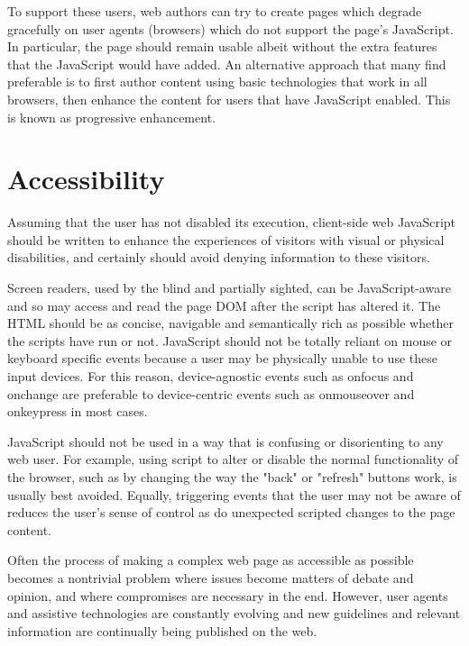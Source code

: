 To support these users, web authors can try to create pages which degrade gracefully on user agents (browsers) which do not support the page's JavaScript. In particular, the page should remain usable albeit without the extra features that the JavaScript would have added. An alternative approach that many find preferable is to first author content using basic technologies that work in all browsers, then enhance the content for users that have JavaScript enabled. This is known as progressive enhancement.

\section{Accessibility}


Assuming that the user has not disabled its execution, client-side web JavaScript should be written to enhance the experiences of visitors with visual or physical disabilities, and certainly should avoid denying information to these visitors.


Screen readers, used by the blind and partially sighted, can be JavaScript-aware and so may access and read the page DOM after the script has altered it. The HTML should be as concise, navigable and semantically rich as possible whether the scripts have run or not. JavaScript should not be totally reliant on mouse or keyboard specific events because a user may be physically unable to use these input devices. For this reason, device-agnostic events such as onfocus and onchange are preferable to device-centric events such as onmouseover and onkeypress in most cases.


JavaScript should not be used in a way that is confusing or disorienting to any web user. For example, using script to alter or disable the normal functionality of the browser, such as by changing the way the "back" or "refresh" buttons work, is usually best avoided. Equally, triggering events that the user may not be aware of reduces the user's sense of control as do unexpected scripted changes to the page content.

Often the process of making a complex web page as accessible as possible becomes a nontrivial problem where issues become matters of debate and opinion, and where compromises are necessary in the end. However, user agents and assistive technologies are constantly evolving and new guidelines and relevant information are continually being published on the web.












